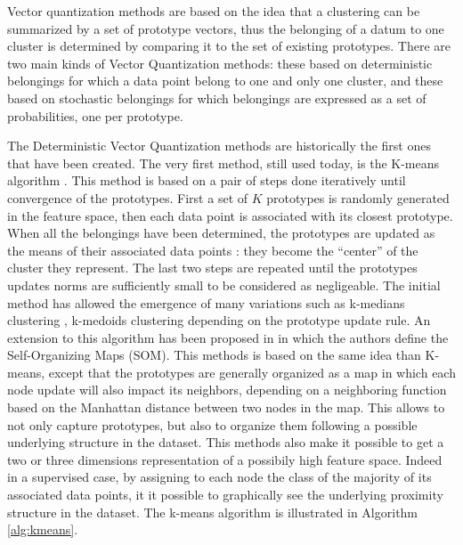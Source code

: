 \documentclass[a4paper]{report}
\begin{document}
    Vector quantization methods are based on the idea that a clustering can be summarized by a set of prototype vectors, thus the belonging of a datum to one cluster is determined by comparing it to the set of existing prototypes. There are two main kinds of Vector Quantization methods: these based on deterministic belongings for which a data point belong to one and only one cluster, and these based on stochastic belongings for which belongings are expressed as a set of probabilities, one per prototype. 

    The Deterministic Vector Quantization methods are historically the first ones that have been created. The very first method, still used today, is the K-means algorithm \cite{macqueen1967some}. This method is based on a pair of steps done iteratively until convergence of the prototypes. First a set of $K$ prototypes is randomly generated in the feature space, then each data point is associated with its closest prototype. When all the belongings have been determined, the prototypes are updated as the means of their associated data points : they become the ``center'' of the cluster they represent. The last two steps are repeated until the prototypes updates norms are sufficiently small to be considered as negligeable. The initial method has allowed the emergence of many variations such as k-medians clustering \cite{jain1988algorithms}, k-medoids clustering \cite{kaufman1987clustering} depending on the prototype update rule. An extension to this algorithm has been proposed in \cite{kohonen1998self} in which the authors define the Self-Organizing Maps (SOM). This methods is based on the same idea than K-means, except that the prototypes are generally organized as a map in which each node update will also impact its neighbors, depending on a neighboring function based on the Manhattan distance between two nodes in the map. This allows to not only capture prototypes, but also to organize them following a possible underlying structure in the dataset. This methods also make it possible to get a two or three dimensions representation of a possibily high feature space. Indeed in a supervised case, by assigning to each node the class of the majority of its associated data points, it it possible to graphically see the underlying proximity structure in the dataset. The k-means algorithm is illustrated in Algorithm \ref{alg:kmeans}.
\end{document}
